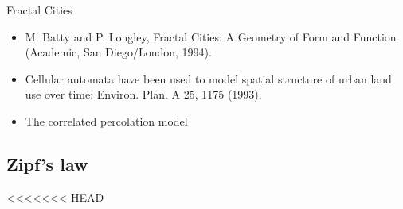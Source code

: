 \documentclass{beamer}
\begin{document}
\begin{frame}{Fractal Cities}
  \begin{itemize}
    \item M. Batty and P. Longley, Fractal Cities: A Geometry of Form
    and Function (Academic, San Diego/London, 1994).
    \item Cellular automata have been used to model spatial structure of urban land use over time: Environ. Plan. A 25, 1175 (1993).
    \item The correlated percolation model

  \end{itemize}
\end{frame}

\subsection{Zipf's law}
<<<<<<< HEAD
\end{document}
